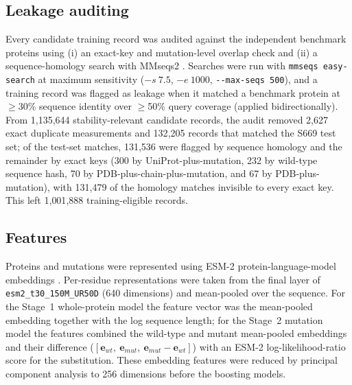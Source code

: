 \documentclass[sn-nature]{sn-jnl}%
\begin{document}
\subsection{Leakage auditing}
Every candidate training record was audited against the independent benchmark proteins using
(i) an exact-key and mutation-level overlap check and (ii) a sequence-homology search with
MMseqs2 \cite{steinegger2017mmseqs2}. Searches were run with \texttt{mmseqs easy-search} at
maximum sensitivity ($-s\ 7.5$, $-e\ 1000$, \texttt{-{}-max-seqs 500}), and a training record
was flagged as leakage when it matched a benchmark protein at $\geq$30\% sequence identity
over $\geq$50\% query coverage (applied bidirectionally). From 1{,}135{,}644 stability-relevant
candidate records, the audit removed 2{,}627 exact duplicate measurements and 132{,}205 records
that matched the S669 test set; of the test-set matches, 131{,}536 were flagged by sequence
homology and the remainder by exact keys (300 by UniProt-plus-mutation, 232 by wild-type
sequence hash, 70 by PDB-plus-chain-plus-mutation, and 67 by PDB-plus-mutation), with 131{,}479
of the homology matches invisible to every exact key. This left 1{,}001{,}888 training-eligible
records.

\subsection{Features}
Proteins and mutations were represented using ESM-2 protein-language-model embeddings
\cite{lin2023esm2}. Per-residue representations were taken from the final layer of
\texttt{esm2\_t30\_150M\_UR50D} (640 dimensions) and mean-pooled over the sequence. For the
Stage~1 whole-protein model the feature vector was the mean-pooled embedding together with
the log sequence length; for the Stage~2 mutation model the features combined the wild-type
and mutant mean-pooled embeddings and their difference
($[\mathbf{e}_{wt},\ \mathbf{e}_{mut},\ \mathbf{e}_{mut}-\mathbf{e}_{wt}]$) with an ESM-2
log-likelihood-ratio score for the substitution. These embedding features were reduced by
principal component analysis to 256 dimensions before the boosting models.
\end{document}
